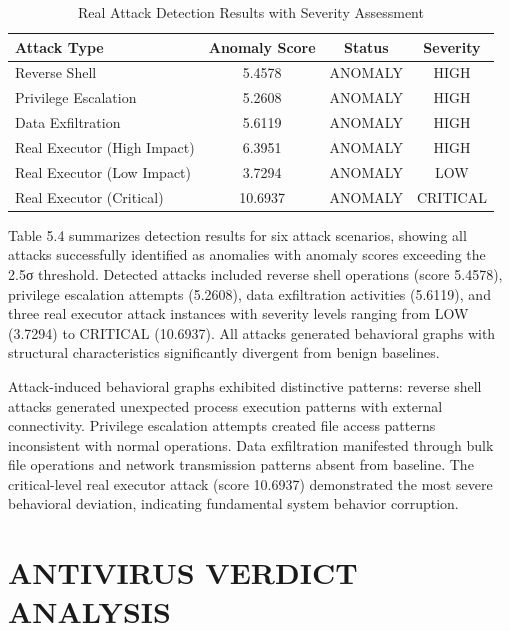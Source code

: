 \begin{table}[H]
\centering
\caption{Real Attack Detection Results with Severity Assessment}
\label{tab:attack_execution}
\begin{tabular}{|l|c|c|c|}
\hline
\textbf{Attack Type} & \textbf{Anomaly Score} & \textbf{Status} & \textbf{Severity} \\ \hline
Reverse Shell & 5.4578 & ANOMALY & HIGH \\ \hline
Privilege Escalation & 5.2608 & ANOMALY & HIGH \\ \hline
Data Exfiltration & 5.6119 & ANOMALY & HIGH \\ \hline
Real Executor (High Impact) & 6.3951 & ANOMALY & HIGH \\ \hline
Real Executor (Low Impact) & 3.7294 & ANOMALY & LOW \\ \hline
Real Executor (Critical) & 10.6937 & ANOMALY & CRITICAL \\ \hline
\end{tabular}
\end{table}

Table 5.4 summarizes detection results for six attack scenarios, showing all attacks successfully identified as anomalies with anomaly scores exceeding the 2.5σ threshold. Detected attacks included reverse shell operations (score 5.4578), privilege escalation attempts (5.2608), data exfiltration activities (5.6119), and three real executor attack instances with severity levels ranging from LOW (3.7294) to CRITICAL (10.6937). All attacks generated behavioral graphs with structural characteristics significantly divergent from benign baselines.

Attack-induced behavioral graphs exhibited distinctive patterns: reverse shell attacks generated unexpected process execution patterns with external connectivity. Privilege escalation attempts created file access patterns inconsistent with normal operations. Data exfiltration manifested through bulk file operations and network transmission patterns absent from baseline. The critical-level real executor attack (score 10.6937) demonstrated the most severe behavioral deviation, indicating fundamental system behavior corruption.

\vspace{0.3cm}

\section{ANTIVIRUS VERDICT ANALYSIS}

